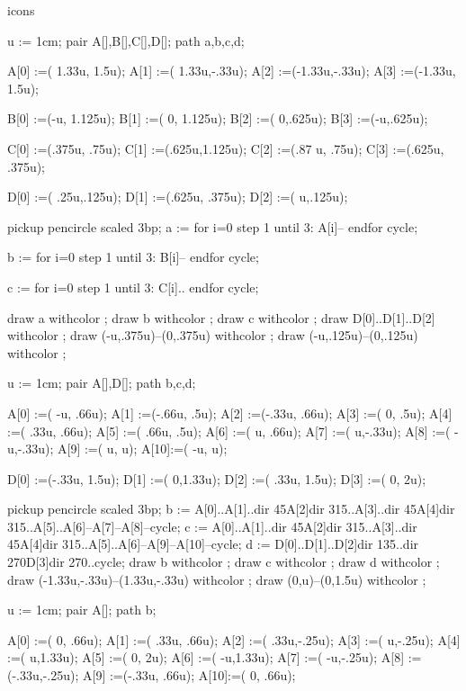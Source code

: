 \startenvironment icons

u := 1cm;
pair A[],B[],C[],D[];
path a,b,c,d;

A[0] :=( 1.33u, 1.5u);
A[1] :=( 1.33u,-.33u);
A[2] :=(-1.33u,-.33u);
A[3] :=(-1.33u, 1.5u);

B[0] :=(-u, 1.125u);
B[1] :=( 0, 1.125u);
B[2] :=( 0,.625u);
B[3] :=(-u,.625u);

C[0] :=(.375u, .75u);
C[1] :=(.625u,1.125u);
C[2] :=(.87 u, .75u);
C[3] :=(.625u, .375u);

D[0] :=( .25u,.125u);
D[1] :=(.625u, .375u);
D[2] :=(    u,.125u);

pickup pencircle scaled 3bp;
a := for i=0 step 1 until 3:
	A[i]--
endfor cycle;

b := for i=0 step 1 until 3:
	B[i]--
endfor cycle;

c := for i=0 step 1 until 3:
	C[i]..
endfor cycle;

draw a withcolor ;
draw b withcolor ;
draw c withcolor ;
draw D[0]..D[1]..D[2] withcolor ;
draw (-u,.375u)--(0,.375u) withcolor ;
draw (-u,.125u)--(0,.125u) withcolor ;

\stopreusableMPgraphic

u := 1cm;
pair A[],D[];
path b,c,d;

A[0] :=(   -u, .66u);
A[1] :=(-.66u,  .5u);
A[2] :=(-.33u, .66u);
A[3] :=(    0,  .5u);
A[4] :=( .33u, .66u);
A[5] :=( .66u,  .5u);
A[6] :=(    u, .66u);
A[7] :=(    u,-.33u);
A[8] :=(   -u,-.33u);
A[9] :=(    u,    u);
A[10]:=(   -u,    u);

D[0] :=(-.33u, 1.5u);
D[1] :=(    0,1.33u);
D[2] :=( .33u, 1.5u);
D[3] :=(    0,   2u);

pickup pencircle scaled 3bp;
b := A[0]..A[1]..{dir 45}A[2]{dir 315}..A[3]..{dir 45}A[4]{dir 315}..A[5]..A[6]--A[7]--A[8]--cycle;
c := A[0]..A[1]..{dir 45}A[2]{dir 315}..A[3]..{dir 45}A[4]{dir 315}..A[5]..A[6]--A[9]--A[10]--cycle;
d := D[0]..D[1]..D[2]{dir 135}..{dir 270}D[3]{dir 270}..cycle;
draw b withcolor ;
draw c withcolor ;
draw d withcolor ;
draw (-1.33u,-.33u)--(1.33u,-.33u) withcolor ;
draw (0,u)--(0,1.5u) withcolor ;
\stopreusableMPgraphic

u := 1cm;
pair A[];
path b;

A[0] :=(    0, .66u);
A[1] :=( .33u, .66u);
A[2] :=( .33u,-.25u);
A[3] :=(    u,-.25u);
A[4] :=(    u,1.33u);
A[5] :=(    0,   2u);
A[6] :=(   -u,1.33u);
A[7] :=(   -u,-.25u);
A[8] :=(-.33u,-.25u);
A[9] :=(-.33u, .66u);
A[10]:=(    0, .66u);

